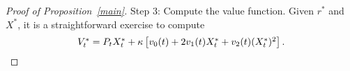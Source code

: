 \documentclass[openany,oneside]{article}
\theoremstyle{definition}
\theoremstyle{remark}
\newcommand{\E}{\mathbb{E}} %
\newcommand{\ts}{\textstyle}
\begin{document}
\begin{proof}[Proof of Proposition~\ref{main}]
Step 3: Compute the value function. Given $r^*$ and $X^*$, it is a straightforward exercise to compute
\[
 \ts V^\ast_t = P_t X_t^\ast + \kappa\left[v_0(t) + 2 v_1(t) X_t^\ast + v_2(t) (X_t^\ast)^2\right].\qedhere
\]
\end{proof}
\end{document}
